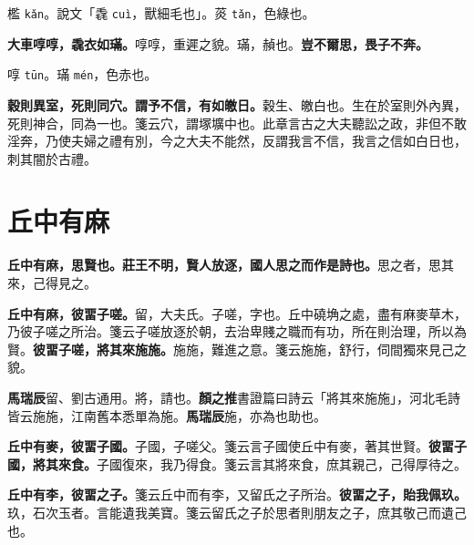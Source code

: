 \begin{quoting}檻 \texttt{kǎn}。說文「毳 \texttt{cuì}，獸細毛也」。菼 \texttt{tǎn}，色綠也。\end{quoting}

\textbf{大車啍啍，毳衣如璊。}{\footnotesize 啍啍，重遲之貌。璊，赬也。}\textbf{豈不爾思，畏子不奔。}

\begin{quoting}啍 \texttt{tūn}。璊 \texttt{mén}，色赤也。\end{quoting}

\textbf{穀則異室，死則同穴。謂予不信，有如皦日。}{\footnotesize 穀生、皦白也。生在於室則外內異，死則神合，同為一也。箋云穴，謂塚壙中也。此章言古之大夫聽訟之政，非但不敢淫奔，乃使夫婦之禮有別，今之大夫不能然，反謂我言不信，我言之信如白日也，刺其闇於古禮。}

\section{丘中有麻}


\textbf{丘中有麻，思賢也。莊王不明，賢人放逐，國人思之而作是詩也。}{\footnotesize 思之者，思其來，己得見之。}

\textbf{丘中有麻，彼畱子嗟。}{\footnotesize 留，大夫氏。子嗟，字也。丘中磽埆之處，盡有麻麥草木，乃彼子嗟之所治。箋云子嗟放逐於朝，去治卑賤之職而有功，所在則治理，所以為賢。}\textbf{彼畱子嗟，將其來施施。}{\footnotesize 施施，難進之意。箋云施施，舒行，伺間獨來見己之貌。}

\begin{quoting}\textbf{馬瑞辰}留、劉古通用。將，請也。\textbf{顏之推}書證篇曰詩云「將其來施施」，河北毛詩皆云施施，江南舊本悉單為施。\textbf{馬瑞辰}施，亦為也助也。\end{quoting}

\textbf{丘中有麥，彼畱子國。}{\footnotesize 子國，子嗟父。箋云言子國使丘中有麥，著其世賢。}\textbf{彼畱子國，將其來食。}{\footnotesize 子國復來，我乃得食。箋云言其將來食，庶其親己，己得厚待之。}

\textbf{丘中有李，彼畱之子。}{\footnotesize 箋云丘中而有李，又留氏之子所治。}\textbf{彼畱之子，貽我佩玖。}{\footnotesize 玖，石次玉者。言能遺我美寶。箋云留氏之子於思者則朋友之子，庶其敬己而遺己也。}

